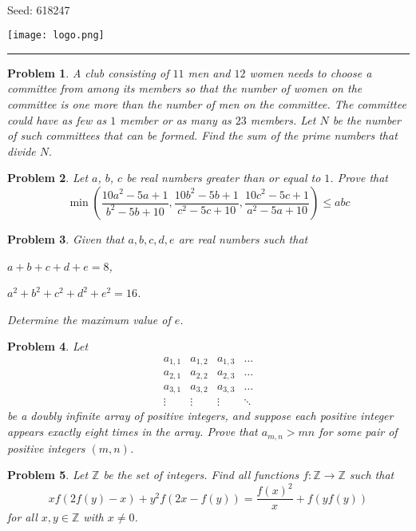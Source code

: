 \documentclass[12pt]{article}
\newtheorem{opg}{Problem}
\begin{document}
\parbox{0.6\textwidth}{ \\[2ex] {\Large Seed: 618247}}
\parbox{0.4\textwidth}{\texttt{[image: logo.png]}}

\hrule

\begin{opg}
A club consisting of $11$ men and $12$ women needs to choose a committee from among its members so that the number of women on the committee is one more than the number of men on the committee. The committee could have as few as $1$ member or as many as $23$ members. Let $N$ be the number of such committees that can be formed. Find the sum of the prime numbers that divide $N.$


\end{opg}
\begin{opg}
Let $a$, $b$, $c$ be real numbers greater than or equal to $1$. Prove that \[\min{\left (\frac{10a^2-5a+1}{b^2-5b+10},\frac{10b^2-5b+1}{c^2-5c+10},\frac{10c^2-5c+1}{a^2-5a+10}\right )}\leq abc\]


\end{opg}
\begin{opg}
Given that $a,b,c,d,e$ are real numbers such that

$a+b+c+d+e=8$,

$a^2+b^2+c^2+d^2+e^2=16$.

Determine the maximum value of $e$.


\end{opg}
\begin{opg}
Let
\[
\begin{array}{cccc} a_{1,1} & a_{1,2} & a_{1,3} & \dots \\
a_{2,1} & a_{2,2} & a_{2,3} & \dots \\
a_{3,1} & a_{3,2} & a_{3,3} & \dots \\
\vdots & \vdots & \vdots & \ddots
\end{array}
\]
be a doubly infinite array of positive integers, and suppose each
positive integer appears exactly eight times in the array. Prove that
$a_{m,n} > mn$ for some pair of positive integers $(m,n)$.

\end{opg}
\begin{opg}
Let $\mathbb{Z}$ be the set of integers. Find all functions $f : \mathbb{Z} \rightarrow \mathbb{Z}$ such that \[xf(2f(y)-x)+y^2f(2x-f(y))=\frac{f(x)^2}{x}+f(yf(y))\] for all $x, y \in \mathbb{Z}$ with $x \neq 0$.


\end{opg}
\end{document}
